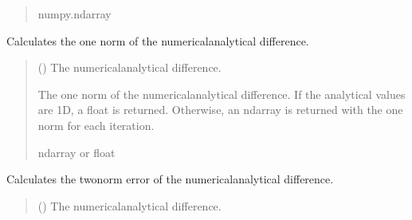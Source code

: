 \documentclass[a4paper,11pt,english,openany]{sphinxmanual}
\begin{document}
\begin{fulllineitems}
\begin{fulllineitems}
\begin{quote}
\begin{description}
\sphinxAtStartPar
numpy.ndarray

\end{description}\end{quote}

\end{fulllineitems}


\begin{fulllineitems}
\label{\detokenize{api/spyice.utils.error_norms:src.spyice.utils.error_norms.ErrorNorms.one_norm}}
\pysigstartsignatures
\pysiglinewithargsret
{}
{}
{}
\pysigstopsignatures
\sphinxAtStartPar
Calculates the one norm of the numerical\sphinxhyphen{}analytical difference.
\begin{quote}\begin{description}
\sphinxAtStartPar
{} () \textendash{} The numerical\sphinxhyphen{}analytical difference.

\sphinxAtStartPar
The one norm of the numerical\sphinxhyphen{}analytical difference. If the analytical values are 1D, a float is returned. Otherwise, an ndarray is returned with the one norm for each iteration.

\sphinxAtStartPar
ndarray or float

\sphinxAtStartPar
{} \textendash{} 

\end{description}\end{quote}

\end{fulllineitems}


\begin{fulllineitems}
\label{\detokenize{api/spyice.utils.error_norms:src.spyice.utils.error_norms.ErrorNorms.two_norm}}
\pysigstartsignatures
\pysiglinewithargsret
{}
{}
{}
\pysigstopsignatures
\sphinxAtStartPar
Calculates the two\sphinxhyphen{}norm error of the numerical\sphinxhyphen{}analytical difference.
\begin{quote}\begin{description}
\sphinxAtStartPar
{} () \textendash{} The numerical\sphinxhyphen{}analytical difference.


\end{description}
\end{quote}
\end{fulllineitems}
\end{fulllineitems}
\end{document}
